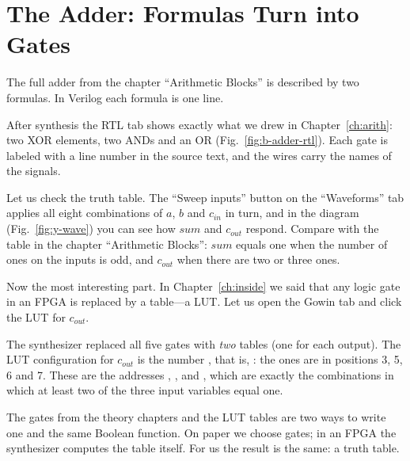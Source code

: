 \section{The Adder: Formulas Turn into Gates}

The full adder from the chapter ``Arithmetic Blocks'' is described by two formulas.
In Verilog each formula is one  line.


After synthesis the RTL tab shows exactly what we drew in Chapter~\ref{ch:arith}:
two XOR elements, two ANDs and an OR (Fig.~\ref{fig:b-adder-rtl}). Each
gate is labeled with a line number in the source text, and the wires carry the names of
the signals.


Let us check the truth table. The ``Sweep inputs'' button on the ``Waveforms'' tab
applies all eight combinations of $a$, $b$ and $c_{in}$ in turn, and in the
diagram (Fig.~\ref{fig:y-wave}) you can see how $sum$ and $c_{out}$ respond.
Compare with the table in the chapter ``Arithmetic Blocks'': $sum$ equals one when
the number of ones on the inputs is odd, and $c_{out}$ when there are two or three ones.

Now the most interesting part. In Chapter~\ref{ch:inside} we said that any logic
gate in an FPGA is replaced by a table---a LUT. Let us open the Gowin tab and click
the LUT for $c_{out}$.


The synthesizer replaced all five gates with \emph{two} tables (one for each
output). The LUT configuration for $c_{out}$ is the number , that is,
: the ones are in positions 3, 5, 6 and 7. These are the addresses
, ,  and , which are exactly the combinations
in which at least two of the three input variables equal one.

\begin{ideabox}
The gates from the theory chapters and the LUT tables are two ways to write one and the same
Boolean function. On paper we choose gates; in an FPGA the synthesizer computes
the table itself. For us the result is the same: a truth table.
\end{ideabox}

